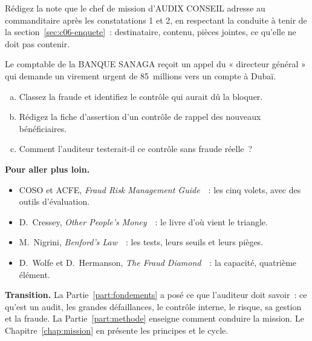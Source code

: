 \begin{boxexo}[title={\ding{45}\quad Exercice~6.9. La note au commanditaire \niveauexpert}]
Rédigez la note que le chef de mission d'AUDIX CONSEIL adresse au
commanditaire après les constatations 1 et 2, en respectant la conduite à
tenir de la section~\ref{sec:c06-enquete}~: destinataire, contenu, pièces
jointes, ce qu'elle ne doit pas contenir.
\end{boxexo}

\begin{boxexo}[title={\ding{45}\quad Exercice~6.10. Une fraude externe \niveauexpert}]
Le comptable de la BANQUE SANAGA reçoit un appel du « directeur général »
qui demande un virement urgent de 85~millions vers un compte à Dubaï.
\begin{enumerate}[(a)]
    \item Classez la fraude et identifiez le contrôle qui aurait dû la
          bloquer.
    \item Rédigez la fiche d'assertion d'un contrôle de rappel des nouveaux
          bénéficiaires.
    \item Comment l'auditeur testerait-il ce contrôle sans fraude réelle~?
\end{enumerate}
\end{boxexo}

\bigskip

\begin{boxinfo}
\textbf{Pour aller plus loin.}
\begin{itemize}
    \item COSO et ACFE, \textit{Fraud Risk Management
          Guide}~\cite{coso2016fraude}~: les cinq volets, avec des outils
          d'évaluation.
    \item D.~Cressey, \textit{Other People's Money}~\cite{cressey1953}~: le
          livre d'où vient le triangle.
    \item M.~Nigrini, \textit{Benford's Law}~\cite{nigrini2012benford}~:
          les tests, leurs seuils et leurs pièges.
    \item D.~Wolfe et D.~Hermanson, \textit{The Fraud
          Diamond}~\cite{wolfe2004diamond}~: la capacité, quatrième élément.
\end{itemize}
\end{boxinfo}

\begin{boxinfo}
\textbf{Transition.} La Partie~\ref{part:fondements} a posé ce que l'auditeur
doit savoir~: ce qu'est un audit, les grandes défaillances, le contrôle
interne, le risque, sa gestion et la fraude. La Partie~\ref{part:methode}
enseigne comment conduire la mission. Le Chapitre~\ref{chap:mission} en
présente les principes et le cycle.
\end{boxinfo}
